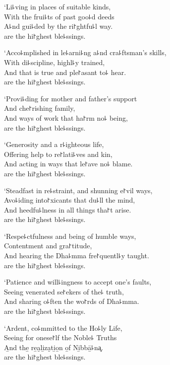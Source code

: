 `Li꜕ving in places of suitable kinds,\\
With the frui꜕ts of past goo꜕d deeds\\
A꜕nd gui꜕ded by the ri꜓ghtfu꜕l way.\\
 are the hi꜓ghest ble꜕ssings.

\clearpage

`Acco꜕mplished in le꜕arni꜕ng a꜕nd cra꜕ftsman's skills,\\
With di꜕scipline, highl꜕y trained,\\
And  that is true and ple꜓asant to꜕ hear.\\
 are the hi꜓ghest ble꜕ssings.

`Provi꜕ding for mother and father's support\\
And che꜓rishing family,\\
And ways of work that ha꜓rm no꜕ being,\\
 are the hi꜓ghest ble꜕ssings.

`Generosity and a r꜕ighteous life,\\
Offering help to re꜓lati꜕ves and kin,\\
And acting in ways that le꜓ave no꜕ blame.\\
 are the hi꜓ghest ble꜕ssings.

`Steadfast in re꜕straint, and shunning e꜓vil ways,\\
Avo꜕iding into꜓xicants that du꜕ll the mind,\\
And heedfu꜕lness in all things tha꜓t arise.\\
 are the hi꜓ghest ble꜕ssings.

`Respe꜕ctfulness and being of humble ways,\\
Contentment and gra꜓titude,\\
And hearing the Dha꜕mma fre꜓quentl꜕y taught.\\
 are the hi꜓ghest ble꜕ssings.

`Patience and will꜕ingness to accept one's faults,\\
Seeing venerated se꜓ekers of the꜕ truth,\\
And sharing o꜕ften the wo꜓rds of Dha꜕mma.\\
 are the hi꜓ghest ble꜕ssings.

\clearpage

`Ardent, co꜕mmitted to the Ho꜕ly Life,\\
Seeing for onese꜓lf the Noble꜕ Truths\\
A̱nd the̱ re̱a̮li̱za̮ti̱o̱n o̱f Ni̱bbā̱꜕na͓.\\
 are the hi꜓ghest ble꜕ssings.

